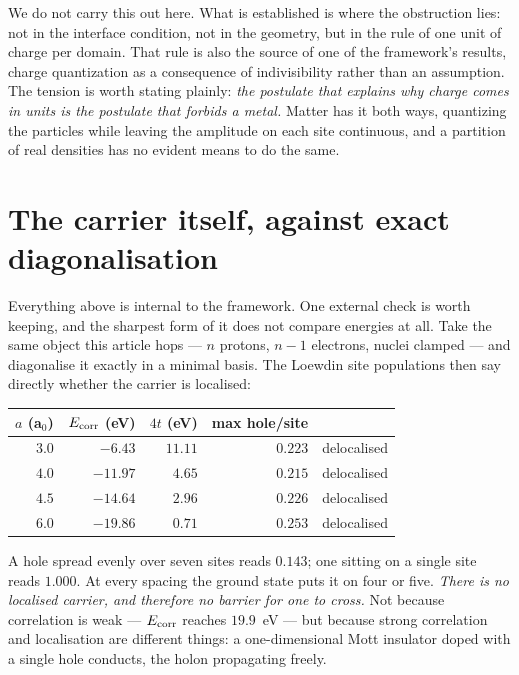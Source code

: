 \documentclass[11pt]{article}
\begin{document}
We do not carry this out here. What is established is where the obstruction lies: not in the
interface condition, not in the geometry, but in the rule of one unit of charge per domain. That rule
is also the source of one of the framework's results, charge quantization as a consequence of
indivisibility rather than an assumption. The tension is worth stating plainly: \emph{the postulate
that explains why charge comes in units is the postulate that forbids a metal.} Matter has it both
ways, quantizing the particles while leaving the amplitude on each site continuous, and a partition
of real densities has no evident means to do the same.

\section{The carrier itself, against exact diagonalisation}\label{sec:stdqm}

Everything above is internal to the framework. One external check is worth keeping, and the sharpest
form of it does not compare energies at all. Take the same object this article hops --- $n$ protons,
$n-1$ electrons, nuclei clamped --- and diagonalise it exactly in a minimal basis. The Loewdin site
populations then say directly whether the carrier is localised:

\begin{center}
\small
\begin{tabular}{@{}rrrrl@{}}
\toprule
$a$ (a$_0$) & $E_{\rm corr}$ (eV) & $4t$ (eV) & max hole/site & \\
\midrule
$3.0$ & $-6.43$ & $11.11$ & $0.223$ & delocalised\\
$4.0$ & $-11.97$ & $4.65$ & $0.215$ & delocalised\\
$4.5$ & $-14.64$ & $2.96$ & $0.226$ & delocalised\\
$6.0$ & $-19.86$ & $0.71$ & $0.253$ & delocalised\\
\bottomrule
\end{tabular}
\end{center}

\noindent A hole spread evenly over seven sites reads $0.143$; one sitting on a single site reads
$1.000$. At every spacing the ground state puts it on four or five. \emph{There is no localised
carrier, and therefore no barrier for one to cross.} Not because correlation is weak ---
$E_{\rm corr}$ reaches $19.9$~eV --- but because strong correlation and localisation are different
things: a one-dimensional Mott insulator doped with a single hole conducts, the holon propagating
freely.
\end{document}
